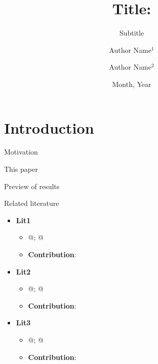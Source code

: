 \documentclass[
  ignorenonframetext,
  aspectratio=169]{beamer}
\title{Title:}
\subtitle{Subtitle}
\author{Author Name\(^1\) \and Author Name\(^2\)}
\date{Month, Year}
\institute{\(^1\)Institution \and \(^2\)Institution}
\providecommand{\tightlist}{%
  \setlength{\itemsep}{0pt}\setlength{\parskip}{0pt}}
\begin{document}
\frame{\titlepage}

\hypertarget{introduction}{%
\section{Introduction}\label{introduction}}

\begin{frame}{Motivation}
\protect\hypertarget{motivation}{}
\label{motivation}
\end{frame}

\begin{frame}{This paper}
\protect\hypertarget{this-paper}{}
\label{thisPaper}
\end{frame}

\begin{frame}{Preview of results}
\protect\hypertarget{preview-of-results}{}
\label{previewResults}
\end{frame}

\begin{frame}{Related literature}
\protect\hypertarget{related-literature}{}
\begin{itemize}
\tightlist
\item
  \textbf{Lit1}

  \begin{itemize}
  \tightlist
  \item
    \begingroup \footnotesize\color{gray} @; @ \endgroup
  \item
    \textbf{Contribution}:
  \end{itemize}
\end{itemize}

\pause

\begin{itemize}
\tightlist
\item
  \textbf{Lit2}

  \begin{itemize}
  \tightlist
  \item
    \begingroup \footnotesize\color{gray} @; @ \endgroup
  \item
    \textbf{Contribution}:
  \end{itemize}
\end{itemize}

\pause

\begin{itemize}
\tightlist
\item
  \textbf{Lit3}

  \begin{itemize}
  \tightlist
  \item
    \begingroup \footnotesize\color{gray} @; @ \endgroup
  \item
    \textbf{Contribution}:
  \end{itemize}
\end{itemize}
\end{frame}
\end{document}
